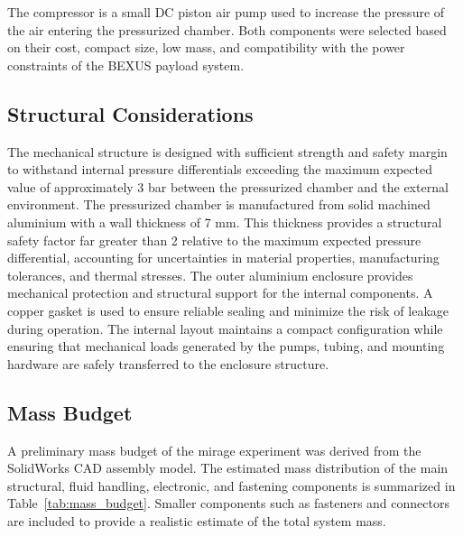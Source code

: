 \documentclass[
  a4paper,
  11pt,
  openany,
  parskip,
  toc=totoc,
  listof=totoc,
  bibliography=totoc
]{scrreprt}
\newcommand{\tref}[1]{Table~\ref{#1}}
\begin{document}
The compressor is a small DC piston air pump used to increase the pressure of the air entering the pressurized chamber. Both components were selected based on their cost, compact size, low mass, and compatibility with the power constraints of the BEXUS payload system.

\subsection{Structural Considerations}

The mechanical structure is designed with sufficient strength and safety margin to withstand internal pressure differentials exceeding the maximum expected value of approximately 3 bar between the pressurized chamber and the external environment.
The pressurized chamber is manufactured from solid machined aluminium with a wall thickness of 7 mm. This thickness provides a structural safety factor far greater than 2 relative to the maximum expected pressure differential, accounting for uncertainties in material properties, manufacturing tolerances, and thermal stresses.
The outer aluminium enclosure provides mechanical protection and structural support for the internal components. A copper gasket is used to ensure reliable sealing and minimize the risk of leakage during operation.
The internal layout maintains a compact configuration while ensuring that mechanical loads generated by the pumps, tubing, and mounting hardware are safely transferred to the enclosure structure.

\subsection{Mass Budget}

A preliminary mass budget of the \gls{mirage} experiment was derived from the SolidWorks CAD assembly model. The estimated mass distribution of the main structural, fluid handling, electronic, and fastening components is summarized in \tref{tab:mass_budget}. Smaller components such as fasteners and connectors are included to provide a realistic estimate of the total system mass.
\end{document}
